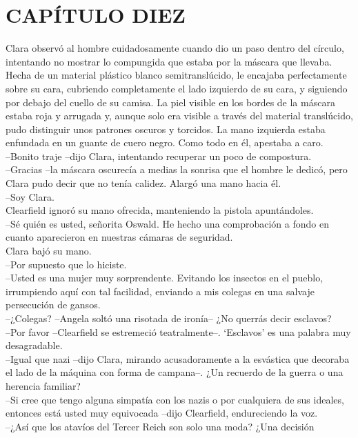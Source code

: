 \chapter*{CAPÍTULO DIEZ}
Clara observó al hombre cuidadosamente cuando dio un paso dentro del
círculo, intentando no mostrar lo compungida que estaba por la máscara
que llevaba. Hecha de un material plástico blanco semitranslúcido, le
encajaba perfectamente sobre su cara, cubriendo completamente el lado
izquierdo de su cara, y siguiendo por debajo del cuello de su camisa. La
piel visible en los bordes de la máscara estaba roja y arrugada y,
aunque solo era visible a través del material translúcido, pudo
distinguir unos patrones oscuros y torcidos. La mano izquierda estaba
enfundada en un guante de cuero negro. Como todo en él, apestaba a
caro.\\
--Bonito traje --dijo Clara, intentando recuperar un poco de
compostura.\\
--Gracias --la máscara oscurecía a medias la sonrisa que el hombre le
dedicó, pero Clara pudo decir que no tenía calidez. Alargó una mano
hacia él.\\
--Soy Clara.\\
Clearfield ignoró su mano ofrecida, manteniendo la pistola
apuntándoles.\\
--Sé quién es usted, señorita Oswald. He hecho una comprobación a fondo
en cuanto aparecieron en nuestras cámaras de seguridad.\\
Clara bajó su mano.\\
--Por supuesto que lo hiciste.\\
--Usted es una mujer muy sorprendente. Evitando los insectos en el
pueblo, irrumpiendo aquí con tal facilidad, enviando a mis colegas en
una salvaje persecución de gansos.\\
--¿Colegas? --Angela soltó una risotada de ironía-- ¿No querrás decir
esclavos?\\
--Por favor --Clearfield se estremeció teatralmente--. `Esclavos' es una
palabra muy desagradable.\\
--Igual que nazi --dijo Clara, mirando acusadoramente a la esvástica que
decoraba el lado de la máquina con forma de campana--. ¿Un recuerdo de
la guerra o una herencia familiar?\\
--Si cree que tengo alguna simpatía con los nazis o por cualquiera de
sus ideales, entonces está usted muy equivocada --dijo Clearfield,
endureciendo la voz.\\
--¿Así que los atavíos del Tercer Reich son solo una moda? ¿Una decisión
